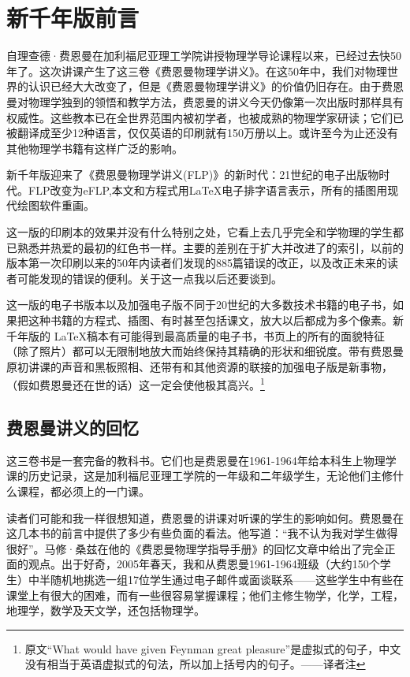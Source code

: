 \documentclass[UTF8, 12pt, a4paper, twoside]{ctexbook}
\begin{document}
\chapter*{新千年版前言}

自理查德·费恩曼在加利福尼亚理工学院讲授物理学导论课程以来，已经过去快50年了。这次讲课产生了这三卷《费恩曼物理学讲义》。在这50年中，我们对物理世界的认识已经大大改变了，但是《费恩曼物理学讲义》的价值仍旧存在。由于费恩曼对物理学独到的领悟和教学方法，费恩曼的讲义今天仍像第一次出版时那样具有权威性。这些教本已在全世界范围内被初学者，也被成熟的物理学家研读；它们已被翻译成至少12种语言，仅仅英语的印刷就有150万册以上。或许至今为止还没有其他物理学书籍有这样广泛的影响。

新千年版迎来了《费恩曼物理学讲义(FLP)》的新时代：21世纪的电子出版物时代。FLP改变为eFLP,本文和方程式用\LaTeX 电子排字语言表示，所有的插图用现代绘图软件重画。

这一版的印刷本的效果并没有什么特别之处，它看上去几乎完全和学物理的学生都已熟悉并热爱的最初的红色书一样。主要的差别在于扩大并改进了的索引，以前的版本第一次印刷以来的50年内读者们发现的885篇错误的改正，以及改正未来的读者可能发现的错误的便利。关于这一点我以后还要谈到。

这一版的电子书版本以及加强电子版不同于20世纪的大多数技术书籍的电子书，如果把这种书籍的方程式、插图、有时甚至包括课文，放大以后都成为多个像素。新千年版的 \LaTeX 稿本有可能得到最高质量的电子书，书页上的所有的面貌特征（除了照片）都可以无限制地放大而始终保持其精确的形状和细锐度。带有费恩曼原初讲课的声音和黑板照相、还带有和其他资源的联接的加强电子版是新事物，（假如费恩曼还在世的话）这一定会使他极其高兴。\footnote{原文“What would have given Feynman great pleasure”是虚拟式的句子，中文没有相当于英语虚拟式的句法，所以加上括号内的句子。——译者注}

\section*{费恩曼讲义的回忆}

这三卷书是一套完备的教科书。它们也是费恩曼在1961-1964年给本科生上物理学课的历史记录，这是加利福尼亚理工学院的一年级和二年级学生，无论他们主修什么课程，都必须上的一门课。

读者们可能和我一样很想知道，费恩曼的讲课对听课的学生的影响如何。费恩曼在这几本书的前言中提供了多少有些负面的看法。他写道：“我不认为我对学生做得很好”。马修·桑兹在他的《费恩曼物理学指导手册》的回忆文章中给出了完全正面的观点。出于好奇，2005年春天，我和从费恩曼1961-1964班级（大约150个学生）中半随机地挑选一组17位学生通过电子邮件或面谈联系——这些学生中有些在课堂上有很大的困难，而有一些很容易掌握课程；他们主修生物学，化学，工程，地理学，数学及天文学，还包括物理学。
\end{document}
